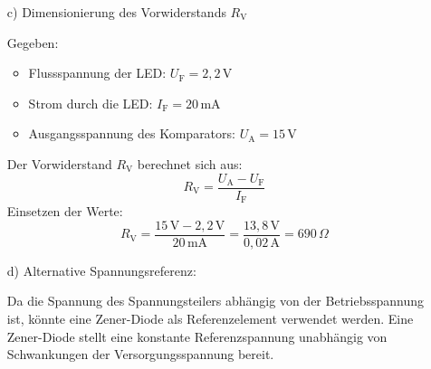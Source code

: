 {\begin{itemize}
    \begin{figure}[H]
        \centering
        
        \label{fig:LsgAkkuUeberwachung1}
    \end{figure}

    \item[c)] Dimensionierung des Vorwiderstands $R_\mathrm{V}$

    Gegeben:
    \begin{itemize}
        \item Flussspannung der LED: $U_\mathrm{F} = 2,2\,\mathrm{V}$
        \item Strom durch die LED: $I_\mathrm{F} = 20\,\mathrm{mA}$
        \item Ausgangsspannung des Komparators: $U_\mathrm{A} = 15\,\mathrm{V}$
    \end{itemize}

    Der Vorwiderstand $R_\mathrm{V}$ berechnet sich aus:
    \[
    R_\mathrm{V} = \frac{U_\mathrm{A} - U_\mathrm{F}}{I_\mathrm{F}}
    \]
    Einsetzen der Werte:
    \[
    R_\mathrm{V} = \frac{15\,\mathrm{V} - 2,2\,\mathrm{V}}{20\,\mathrm{mA}} = \frac{13,8\,\mathrm{V}}{0,02\,\mathrm{A}} = 690\,\Omega
    \]

    \begin{figure}[H]
        \centering
        \begin{subfigure}[b]{0.45\textwidth}
            \centering
            
            \label{fig:LsgAkkuUeberwachung2}
        \end{subfigure}
        \hfill
        \begin{subfigure}[b]{0.45\textwidth}
            \centering
            
            \label{fig:LsgAkkuUeberwachung3}
        \end{subfigure}
        \label{fig:BeideLoesungen}
    \end{figure}

    \item[d)] Alternative Spannungsreferenz:

    Da die Spannung des Spannungsteilers abhängig von der Betriebsspannung ist, könnte eine Zener-Diode als Referenzelement verwendet werden. Eine Zener-Diode stellt eine konstante Referenzspannung unabhängig von Schwankungen der Versorgungsspannung bereit.


\end{itemize}}
